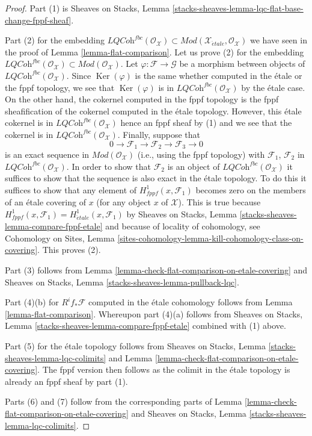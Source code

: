 \documentclass{stacks-project}
\theoremstyle{plain}
\theoremstyle{definition}
\theoremstyle{remark}
\numberwithin{equation}{subsection}
\def\etale{{\acute{e}tale}}
\def\Ker{\mathop{\mathrm{Ker}}}
\begin{document}
\begin{proof}
Part (1) is
Sheaves on Stacks, Lemma
\ref{stacks-sheaves-lemma-lqc-flat-base-change-fppf-sheaf}.

\medskip\noindent
Part (2) for the embedding
$\textit{LQCoh}^{fbc}(\mathcal{O}_\mathcal{X}) \subset
\textit{Mod}(\mathcal{X}_\etale, \mathcal{O}_\mathcal{X})$
we have seen in the proof of
Lemma \ref{lemma-flat-comparison}.
Let us prove (2) for the embedding
$\textit{LQCoh}^{fbc}(\mathcal{O}_\mathcal{X}) \subset
\textit{Mod}(\mathcal{O}_\mathcal{X})$.
Let $\varphi : \mathcal{F} \to \mathcal{G}$ be a morphism between
objects of $\textit{LQCoh}^{fbc}(\mathcal{O}_\mathcal{X})$. Since
$\Ker(\varphi)$
is the same whether computed in the \'etale or the fppf
topology, we see that $\Ker(\varphi)$ is in
$\textit{LQCoh}^{fbc}(\mathcal{O}_\mathcal{X})$
by the \'etale case. On the other hand,
the cokernel computed in the fppf topology is the fppf sheafification
of the cokernel computed in the \'etale topology. However, this
\'etale cokernel is in $\textit{LQCoh}^{fbc}(\mathcal{O}_\mathcal{X})$
hence an fppf sheaf
by (1) and we see that the cokernel is in
$\textit{LQCoh}^{fbc}(\mathcal{O}_\mathcal{X})$.
Finally, suppose that
$$
0 \to \mathcal{F}_1 \to \mathcal{F}_2 \to \mathcal{F}_3 \to 0
$$
is an exact sequence in $\textit{Mod}(\mathcal{O}_\mathcal{X})$
(i.e., using the fppf topology) with $\mathcal{F}_1$, $\mathcal{F}_2$
in $\textit{LQCoh}^{fbc}(\mathcal{O}_\mathcal{X})$. In order to show that
$\mathcal{F}_2$ is an object of $\textit{LQCoh}^{fbc}(\mathcal{O}_\mathcal{X})$
it suffices to show that
the sequence is also exact in the \'etale topology. To do this it
suffices to show that any element of $H^1_{fppf}(x, \mathcal{F}_1)$
becomes zero on the members of an \'etale covering of $x$ (for any
object $x$ of $\mathcal{X}$). This is true because
$H^1_{fppf}(x, \mathcal{F}_1) = H^1_\etale(x, \mathcal{F}_1)$ by
Sheaves on Stacks, Lemma \ref{stacks-sheaves-lemma-compare-fppf-etale}
and because of locality of cohomology, see
Cohomology on Sites, Lemma
\ref{sites-cohomology-lemma-kill-cohomology-class-on-covering}.
This proves (2).

\medskip\noindent
Part (3) follows from
Lemma \ref{lemma-check-flat-comparison-on-etale-covering}
and
Sheaves on Stacks, Lemma \ref{stacks-sheaves-lemma-pullback-lqc}.

\medskip\noindent
Part (4)(b) for $R^if_*\mathcal{F}$ computed in the \'etale cohomology
follows from Lemma \ref{lemma-flat-comparison}.
Whereupon part (4)(a) follows from
Sheaves on Stacks, Lemma \ref{stacks-sheaves-lemma-compare-fppf-etale}
combined with (1) above.

\medskip\noindent
Part (5) for the \'etale topology follows from
Sheaves on Stacks, Lemma \ref{stacks-sheaves-lemma-lqc-colimits} and
Lemma \ref{lemma-check-flat-comparison-on-etale-covering}.
The fppf version then follows as the colimit in the \'etale
topology is already an fppf sheaf by part (1).

\medskip\noindent
Parts (6) and (7) follow from the corresponding parts of
Lemma \ref{lemma-check-flat-comparison-on-etale-covering} and
Sheaves on Stacks, Lemma \ref{stacks-sheaves-lemma-lqc-colimits}.
\end{proof}
\end{document}
